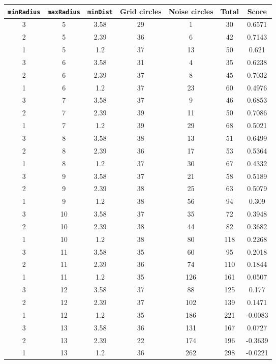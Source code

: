 \documentclass[letterpaper, 12pt]{article}
\begin{document}
\begin{longtable}{|c|c|c|c|c|c|c|}
\hline
\textbf{\texttt{minRadius}} & \textbf{\texttt{maxRadius}} & \textbf{\texttt{minDist}} & \textbf{Grid circles} & \textbf{Noise circles} & \textbf{Total} & \textbf{Score} \\
\hline
3 & 5 & 3.58 & 29 & 1 & 30 & 0.6571 \\
\hline
2 & 5 & 2.39 & 36 & 6 & 42 & 0.7143 \\
\hline
1 & 5 & 1.2 & 37 & 13 & 50 & 0.621 \\
\hline
3 & 6 & 3.58 & 31 & 4 & 35 & 0.6238 \\
\hline
2 & 6 & 2.39 & 37 & 8 & 45 & 0.7032 \\
\hline
1 & 6 & 1.2 & 37 & 23 & 60 & 0.4976 \\
\hline
3 & 7 & 3.58 & 37 & 9 & 46 & 0.6853 \\
\hline
2 & 7 & 2.39 & 39 & 11 & 50 & 0.7086 \\
\hline
1 & 7 & 1.2 & 39 & 29 & 68 & 0.5021 \\
\hline
3 & 8 & 3.58 & 38 & 13 & 51 & 0.6499 \\
\hline
2 & 8 & 2.39 & 36 & 17 & 53 & 0.5364 \\
\hline
1 & 8 & 1.2 & 37 & 30 & 67 & 0.4332 \\
\hline
3 & 9 & 3.58 & 37 & 21 & 58 & 0.5189 \\
\hline
2 & 9 & 2.39 & 38 & 25 & 63 & 0.5079 \\
\hline
1 & 9 & 1.2 & 38 & 56 & 94 & 0.309 \\
\hline
3 & 10 & 3.58 & 37 & 35 & 72 & 0.3948 \\
\hline
2 & 10 & 2.39 & 38 & 44 & 82 & 0.3682 \\
\hline
1 & 10 & 1.2 & 38 & 80 & 118 & 0.2268 \\
\hline
3 & 11 & 3.58 & 35 & 60 & 95 & 0.2018 \\
\hline
2 & 11 & 2.39 & 36 & 74 & 110 & 0.1844 \\
\hline
1 & 11 & 1.2 & 35 & 126 & 161 & 0.0507 \\
\hline
3 & 12 & 3.58 & 37 & 88 & 125 & 0.177 \\
\hline
2 & 12 & 2.39 & 37 & 102 & 139 & 0.1471 \\
\hline
1 & 12 & 1.2 & 35 & 186 & 221 & -0.0083 \\
\hline
3 & 13 & 3.58 & 36 & 131 & 167 & 0.0727 \\
\hline
2 & 13 & 2.39 & 22 & 174 & 196 & -0.3639 \\
\hline
1 & 13 & 1.2 & 36 & 262 & 298 & -0.0221 \\

\end{longtable}
\end{document}
